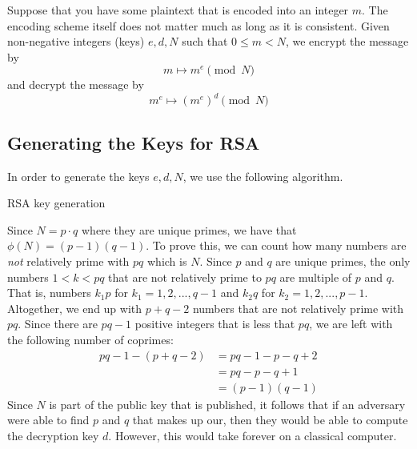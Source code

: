 \documentclass{article}
\begin{document}
Suppose that you have some plaintext that is encoded into an integer $m$. The encoding scheme itself does not matter much as long as it is consistent. Given non-negative integers (keys) $e, d, N$ such that $0 \leq m < N$, we encrypt the message by 
$$ m \mapsto m^e \pmod N $$
and decrypt the message by
$$ m^e \mapsto (m^e)^d \pmod N $$

\subsection{Generating the Keys for RSA}

In order to generate the keys \(e, d, N\), we use the following algorithm.

\begin{algorithm}
\caption{RSA key generation}
\label{alg:rsa-keygen}
\begin{algorithmic}[1]
    \EndProcedure
\end{algorithmic}
\end{algorithm}

Since \(N = p \cdot q\) where they are unique primes, we have that \(\phi(N) = (p-1)(q-1)\). To prove this, we can count how many numbers are \textit{not} relatively prime with \(pq\) which is \(N\). Since \(p\) and \(q\) are unique primes, the only numbers \(1 < k < pq\) that are not relatively prime to \(pq\) are multiple of \(p\) and \(q\). That is, numbers \(k_1p\) for \(k_1 = 1, 2, ..., q-1\) and \(k_2q\) for \(k_2 = 1, 2, ..., p-1\). Altogether, we end up with \(p+q-2\) numbers that are not relatively prime with \(pq\). Since there are \(pq-1\) positive integers that is less that \(pq\), we are left with the following number of coprimes:
\[
\begin{aligned}
    pq-1 - (p+q-2) &= pq - 1 - p - q + 2 \\
                   &= pq - p - q + 1 \\
                   &= (p-1)(q-1)
\end{aligned}
\]
Since \(N\) is part of the public key that is published, it follows that if an adversary were able to find \(p\) and \(q\) that makes up our, then they would be able to compute the decryption key \(d\). However, this would take forever on a classical computer.
\end{document}
